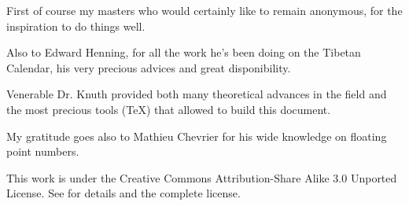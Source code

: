 First of course my masters who would certainly like to remain anonymous, for the inspiration to do things well.

Also to Edward Henning, for all the work he's been doing on the Tibetan Calendar, his very precious advices and great disponibility.

Venerable Dr. Knuth provided both many theoretical advances in the field and the most precious tools (\TeX ) that allowed to build this document.

My gratitude goes also to Mathieu Chevrier for his wide knowledge on floating point numbers.


This work is under the Creative Commons Attribution-Share Alike 3.0 Unported License. See \cite{CCASA} for details and the complete license.
